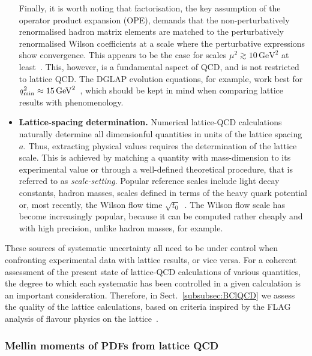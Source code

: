 \begin{itemize}
Finally, it is worth noting that factorisation, the key assumption of
the operator product expansion (OPE), demands that the non-perturbatively 
renormalised hadron matrix elements are matched to the perturbatively 
renormalised Wilson coefficients at a scale where the perturbative 
expressions show convergence. 
%
This appears to be the case for scales $\mu^2 \gtrsim 10 \, \mbox{GeV}^2$ at
least~\cite{Gockeler:2010yr}. 
%
This, however, is a fundamental aspect of QCD, and is not restricted to 
lattice QCD. 
%
The DGLAP evolution equations, for example, work best for $q^2_{\rm min} \approx
15 \, \mbox{GeV}^2$~\cite{Abramowicz:2015mha}, which should be kept in
mind when comparing lattice results with phenomenology.

\item {\bfseries Lattice-spacing determination.} 
Numerical lattice-QCD calculations naturally determine all dimensionful 
quantities in units of the lattice spacing $a$. 
%
Thus, extracting physical values requires the determination of the lattice 
scale. 
%
This is achieved by matching a quantity with mass-dimension to its experimental 
value or through a well-defined theoretical procedure, that is referred to as
{\it scale-setting}. 
%
Popular reference scales include light decay constants, hadron masses, scales 
defined in terms of the heavy quark potential or, most recently, the Wilson 
flow time $\sqrt{t_0}$~\cite{Luscher:2010iy}. 
%
The Wilson flow scale has become increasingly popular, because it can be 
computed rather cheaply and with high precision, unlike hadron masses, 
for example.

\end{itemize}

These sources of systematic uncertainty all need to be under control
when confronting experimental data with lattice results, or vice versa.
%
For a coherent assessment of the present state of lattice-QCD
calculations of various quantities, the degree to which each
systematic has been controlled in a given calculation is an important
consideration.
%
Therefore, in Sect.~\ref{subsubsec:BClQCD} we assess the
quality of the lattice calculations, based on criteria inspired by the
FLAG analysis of flavour physics on the lattice~\cite{Aoki:2016frl}.

\subsubsection{Mellin moments of PDFs from lattice QCD}
\label{Sec:MomentsLQCD}


